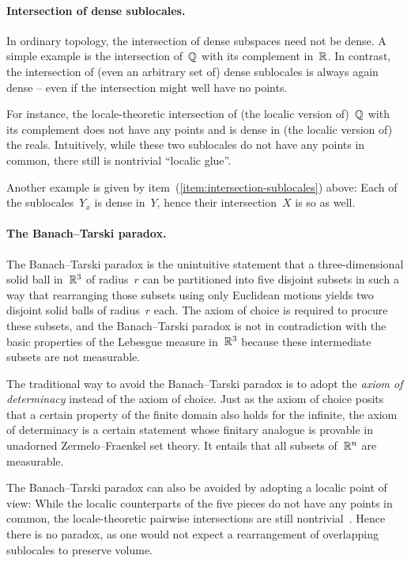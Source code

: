 \documentclass{ws-rv9x6}
\begin{document}
{\paragraph{Intersection of dense sublocales.} In ordinary topology, the
intersection of dense subspaces need not be dense. A simple example is the
intersection of~$\mathbb{Q}$ with its complement in~$\mathbb{R}$. In contrast, the
intersection of (even an arbitrary set of) dense sublocales is always again
dense -- even if the intersection might well have no points.

For instance, the locale-theoretic intersection of (the localic version
of)~$\mathbb{Q}$ with its complement does not have any points and is dense in (the
localic version of) the reals. Intuitively, while these two sublocales do not
have any points in common, there still is nontrivial ``localic glue''.


Another example is given by item~(\ref{item:intersection-sublocales}) above:
Each of the sublocales~$Y_x$ is dense in~$Y$, hence their intersection~$X$ is
so as well.


\paragraph{The Banach--Tarski paradox.} The Banach--Tarski paradox is the
unintuitive statement that a three-dimensional solid ball in~$\mathbb{R}^3$ of
radius~$r$ can be partitioned into five disjoint subsets in such a way that
rearranging those subsets using only Euclidean motions yields two disjoint
solid balls of radius~$r$ each. The axiom of choice is required to procure
these subsets, and the Banach--Tarski paradox is not in
contradiction with the basic properties of the Lebesgue measure in~$\mathbb{R}^3$
because these intermediate subsets are not measurable.

The traditional way to avoid the Banach--Tarski paradox is to adopt the
\emph{axiom of determinacy} instead of the axiom of choice. Just as the axiom
of choice posits that a certain property of the finite domain also holds for the
infinite, the axiom of determinacy is a certain statement whose finitary
analogue is provable in unadorned Zermelo--Fraenkel set theory. It entails that
all subsets of~$\mathbb{R}^n$ are measurable.

The Banach--Tarski paradox can also be avoided by adopting a localic point of
view: While the localic counterparts of the five pieces do not have any points
in common, the locale-theoretic pairwise intersections are still nontrivial~\cite{simpson:measure}.
Hence there is no paradox, as one would not expect a rearrangement of
overlapping sublocales to preserve volume.


}
\end{document}
